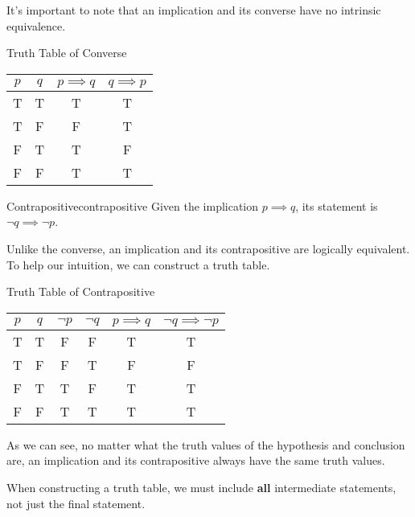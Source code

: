 It's important to note that an implication and its converse have no intrinsic equivalence.


\begin{exbox}{Truth Table of Converse}{}
    \begin{center}\begin{tabular}{c | c || c | c}
        $p$ & $q$ & $p \implies q$ & $q \implies p$ \\ \hline
        T & T & T & T \\
        T & F & F & T \\
        F & T & T & F \\
        F & F & T & T
    \end{tabular}\end{center}
\end{exbox}

\begin{dfnbox}{Contrapositive}{contrapositive}
    Given the implication $p \implies q$, its  statement is $\neg q \implies \neg p$.
\end{dfnbox}

Unlike the converse, an implication and its contrapositive are logically equivalent. To help our intuition, we can construct a truth table.

\begin{exbox}{Truth Table of Contrapositive}{}
    \begin{center}\begin{tabular}{c | c || c | c | c | c}
        $p$ & $q$ & $\neg p$ & $\neg q$ & $p \implies q$ & $\neg q \implies \neg p$ \\ \hline
        T & T & F & F & T & T \\
        T & F & F & T & F & F \\
        F & T & T & F & T & T \\
        F & F & T & T & T & T
    \end{tabular}\end{center}
\end{exbox}

As we can see, no matter what the truth values of the hypothesis and conclusion are, an implication and its contrapositive always have the same truth values.

\begin{notebox}
    When constructing a truth table, we must include \textbf{all} intermediate statements, not just the final statement.
\end{notebox}


